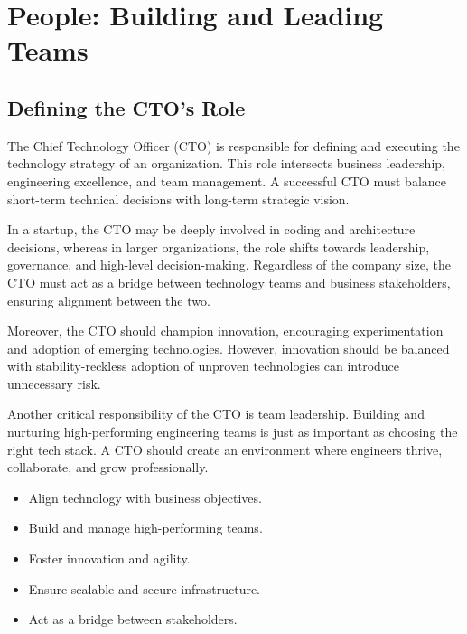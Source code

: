 \chapter{People: Building and Leading Teams}

\section{Defining the CTO's Role}
The Chief Technology Officer (CTO) is responsible for defining and executing the technology strategy of an organization. This role intersects business leadership, engineering excellence, and team management. A successful CTO must balance short-term technical decisions with long-term strategic vision.

In a startup, the CTO may be deeply involved in coding and architecture decisions, whereas in larger organizations, the role shifts towards leadership, governance, and high-level decision-making. Regardless of the company size, the CTO must act as a bridge between technology teams and business stakeholders, ensuring alignment between the two.

Moreover, the CTO should champion innovation, encouraging experimentation and adoption of emerging technologies. However, innovation should be balanced with stability-reckless adoption of unproven technologies can introduce unnecessary risk.

Another critical responsibility of the CTO is team leadership. Building and nurturing high-performing engineering teams is just as important as choosing the right tech stack. A CTO should create an environment where engineers thrive, collaborate, and grow professionally.

\begin{itemize}
    \item Align technology with business objectives.
    \item Build and manage high-performing teams.
    \item Foster innovation and agility.
    \item Ensure scalable and secure infrastructure.
    \item Act as a bridge between stakeholders.
\end{itemize}







% 

